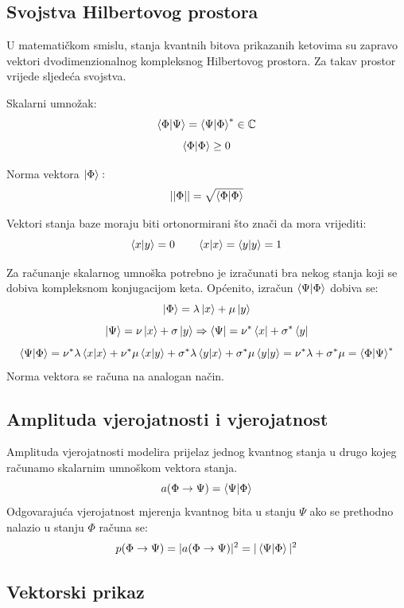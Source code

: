 \subsection{Svojstva Hilbertovog prostora}
U matematičkom smislu, stanja kvantnih bitova prikazanih ketovima su zapravo vektori dvodimenzionalnog kompleksnog Hilbertovog prostora. Za takav prostor vrijede sljedeća svojstva.

Skalarni umnožak:
\[
\braket{\Phi|\Psi} = \braket{\Psi|\Phi}^* \in \mathbb{C}
\]
\[
\braket{\Phi|\Phi} \geq 0
\]

Norma vektora $\ket{\Phi}:$
\[
||\Phi|| = \sqrt{\braket{\Phi|\Phi}}
\]

Vektori stanja baze moraju biti ortonormirani što znači da mora vrijediti:
\[
\braket{x|y} = 0
\qquad
\braket{x|x} = \braket{y|y} = 1
\]

Za računanje skalarnog umnoška potrebno je izračunati bra nekog stanja koji se dobiva kompleksnom konjugacijom keta. Općenito, izračun $\braket{\Psi|\Phi}$ dobiva se:
\[\ket{\Phi} = \lambda\ket{x} + \mu\ket{y}\]
\[\ket{\Psi} = \nu\ket{x} + \sigma\ket{y} \Rightarrow \bra{\Psi} = \nu^*\bra{x} + \sigma^*\bra{y}\]
\[
\braket{\Psi|\Phi} = \nu^*\lambda\braket{x|x} + \nu^*\mu\braket{x|y} + \sigma^*\lambda\braket{y|x} + \sigma^*\mu\braket{y|y} = \nu^*\lambda + \sigma^*\mu = \braket{\Phi|\Psi}^*
\]
Norma vektora se računa na analogan način.

\subsection{Amplituda vjerojatnosti i vjerojatnost}

Amplituda vjerojatnosti modelira prijelaz jednog kvantnog stanja u drugo kojeg računamo skalarnim umnoškom vektora stanja.
\[
a(\Phi \rightarrow \Psi) = \braket{\Psi|\Phi}
\]
Odgovarajuća vjerojatnost mjerenja kvantnog bita u stanju $\Psi$ ako se prethodno nalazio u stanju $\Phi$ računa se:
\[
p(\Phi \rightarrow \Psi) = |a(\Phi \rightarrow \Psi)|^2 = |\braket{\Psi|\Phi}|^2
\]

\subsection{Vektorski prikaz}

